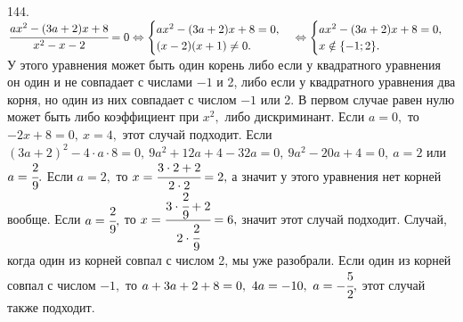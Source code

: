 144. $\cfrac{ax^2-(3a+2)x+8}{x^2-x-2}=0\Leftrightarrow \begin{cases}
ax^2-(3a+2)x+8=0,\\ (x-2)(x+1)\neq0.\end{cases}\Leftrightarrow \begin{cases}
ax^2-(3a+2)x+8=0,\\ x\notin\{-1;2\}.\end{cases}$ У этого уравнения может быть один корень либо если у квадратного уравнения он один и не совпадает с числами $-1$ и 2, либо если у квадратного уравнения два корня, но один из них совпадает с числом $-1$ или 2. В первом случае равен нулю может быть либо коэффициент при $x^2,$ либо дискриминант. Если $a=0,$ то $-2x+8=0,\ x=4,$ этот случай подходит. Если $(3a+2)^2-4\cdot a\cdot8=0,\ 9a^2+12a+4-32a=0,\
9a^2-20a+4=0,\ a=2$ или $a=\cfrac{2}{9}.$ Если $a=2,$ то $x=\cfrac{3\cdot2+2}{2\cdot2}=2,$ а значит у этого уравнения нет корней вообще. Если $a=\cfrac{2}{9},$ то $x=\cfrac{3\cdot\cfrac{2}{9}+2}{2\cdot\cfrac{2}{9}}=6,$ значит этот случай подходит. Случай, когда один из корней совпал с числом 2, мы уже разобрали. Если один из корней совпал с числом $-1,$ то $a+3a+2+8=0,\ 4a=-10,\ a=-\cfrac{5}{2},$ этот случай также подходит.\\
